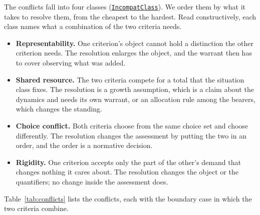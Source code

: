 \documentclass[11pt]{article}
\newcommand{\lean}[1]{\hyperref[lean:#1]{\nolinkurl{#1}}}
\begin{document}
The conflicts fall into four classes (\lean{IncompatClass}).
We order them by what it takes to resolve them, from the cheapest to the hardest.
Read constructively, each class names what a combination of the two criteria needs.
\begin{itemize}[leftmargin=1.5em,itemsep=0pt]
  \item \textbf{Representability.} One criterion's object cannot hold a distinction the other criterion needs. The resolution enlarges the object, and the warrant then has to cover observing what was added.
  \item \textbf{Shared resource.} The two criteria compete for a total that the situation class fixes. The resolution is a growth assumption, which is a claim about the dynamics and needs its own warrant, or an allocation rule among the bearers, which changes the standing.
  \item \textbf{Choice conflict.} Both criteria choose from the same choice set and choose differently. The resolution changes the assessment by putting the two in an order, and the order is a normative decision.
  \item \textbf{Rigidity.} One criterion accepts only the part of the other's demand that changes nothing it cares about. The resolution changes the object or the quantifiers; no change inside the assessment does.
\end{itemize}
Table~\ref{tab:conflicts} lists the conflicts, each with the boundary case in which the two criteria combine.
\end{document}
